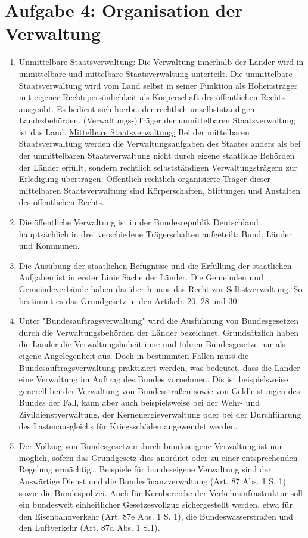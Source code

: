\documentclass{article}
\begin{document}
	\section*{Aufgabe 4: Organisation der Verwaltung}
	\begin{enumerate}[label=(\alph*)]
		\item \underline{Unmittelbare Staatsverwaltung:} Die Verwaltung innerhalb der Länder wird in unmittelbare und mittelbare Staatsverwaltung unterteilt. Die unmittelbare Staatsverwaltung wird vom Land selbst in seiner Funktion als Hoheitsträger mit eigener Rechtspersönlichkeit als Körperschaft des öffentlichen Rechts ausgeübt. Es bedient sich hierbei der rechtlich unselbstständigen Landesbehörden. (Verwaltungs-)Träger der unmittelbaren Staatsverwaltung ist das Land. \underline{Mittelbare Staatsverwaltung:} Bei der mittelbaren Staatsverwaltung werden die Verwaltungsaufgaben des Staates anders als bei der unmittelbaren Staatsverwaltung nicht durch eigene staatliche Behörden der Länder erfüllt, sondern rechtlich selbstständigen Verwaltungsträgern zur Erledigung übertragen. Öffentlich-rechtlich organisierte Träger dieser mittelbaren Staatsverwaltung sind Körperschaften, Stiftungen und Anstalten des öffentlichen Rechts.
		\item Die öffentliche Verwaltung ist in der Bundesrepublik Deutschland hauptsächlich in drei verschiedene Trägerschaften aufgeteilt: Bund, Länder und Kommunen.
		\item Die Ausübung der staatlichen Befugnisse und die Erfüllung der staatlichen Aufgaben ist in erster Linie Sache der Länder. Die Gemeinden und Gemeindeverbände haben darüber hinaus das Recht zur Selbstverwaltung. So bestimmt es das Grundgesetz in den Artikeln 20, 28 und 30.
		\item Unter "Bundesauftragsverwaltung" wird die Ausführung von Bundesgesetzen durch die Verwaltungsbehörden der Länder bezeichnet. Grundsätzlich haben die Länder die Verwaltungshoheit inne und führen Bundesgesetze nur als eigene Angelegenheit aus. Doch in bestimmten Fällen muss die Bundesauftragsverwaltung praktiziert werden, was bedeutet, dass die Länder eine Verwaltung im Auftrag des Bundes vornehmen. Dis ist beispielsweise generell bei der Verwaltung von Bundesstraßen sowie von Geldleistungen des Bundes der Fall, kann aber auch beispielsweise bei der Wehr- und Zivildienstverwaltung, der Kernenergieverwaltung oder bei der Durchführung des Lastenausgleichs für Kriegsschäden angewendet werden.
		\item Der Vollzug von Bundesgesetzen durch bundeseigene Verwaltung ist nur möglich, sofern das Grundgesetz dies anordnet oder zu einer entsprechenden Regelung ermächtigt. Beispiele für bundeseigene Verwaltung sind der Auswärtige Dienst und die Bundesfinanzverwaltung (Art. 87 Abs. 1 S. 1) sowie die Bundespolizei. Auch für Kernbereiche der Verkehrsinfrastruktur soll ein bundesweit einheitlicher Gesetzesvollzug sichergestellt werden, etwa für den Eisenbahnverkehr (Art. 87e Abs. 1 S. 1), die Bundeswasserstraßen und den Luftverkehr (Art. 87d Abs. 1 S.1).

\end{enumerate}
\end{document}
